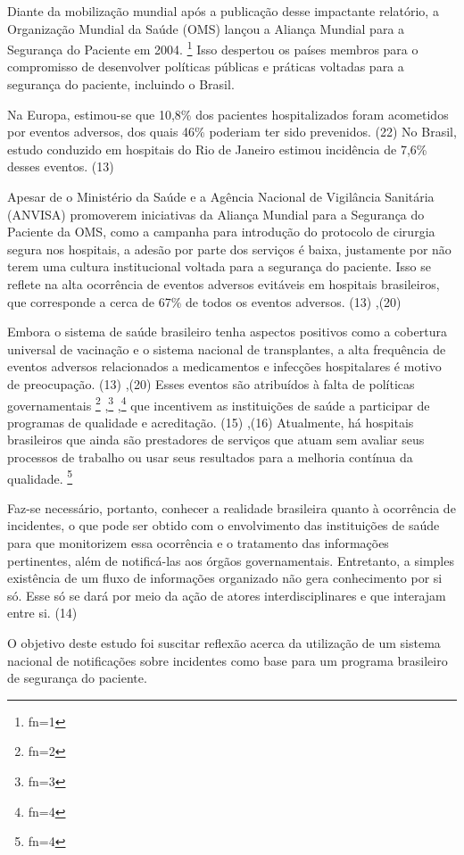 \documentclass{article}
\makeatletter
\newcommand{\fn}{\afterassignment\fn@aux\count0=}
\newcommand{\fn@aux}{\csname fn\the\count0\endcsname}
\makeatother
\begin{document}
Diante da mobilização mundial após a publicação desse impactante relatório, a
Organização
Mundial da Saúde (OMS) lançou a Aliança Mundial para a Segurança do Paciente em
2004. \footnote{\fn1}
Isso despertou os países membros para o compromisso de desenvolver políticas
públicas e práticas voltadas para a segurança do paciente, incluindo o Brasil.

Na Europa, estimou-se que 10,8\% dos pacientes hospitalizados foram acometidos
por eventos
adversos, dos quais 46\% poderiam ter sido prevenidos. (22)
No Brasil, estudo conduzido em hospitais do Rio de Janeiro estimou incidência de
7,6\% desses eventos. (13)

Apesar de o Ministério da Saúde e a Agência Nacional de Vigilância Sanitária
(ANVISA)
promoverem iniciativas da Aliança Mundial para a Segurança do Paciente da OMS,
como a
campanha para introdução do protocolo de cirurgia segura nos hospitais, a adesão
por parte
dos serviços é baixa, justamente por não terem uma cultura institucional voltada
para a
segurança do paciente. Isso se reflete na alta ocorrência de eventos adversos
evitáveis em
hospitais brasileiros, que corresponde a cerca de 67\% de todos os eventos
adversos. (13)
,(20)

Embora o sistema de saúde brasileiro tenha aspectos positivos como a cobertura
universal de
vacinação e o sistema nacional de transplantes, a alta frequência de eventos
adversos
relacionados a medicamentos e infecções hospitalares é motivo de preocupação.
(13)
,(20)
Esses eventos são atribuídos à falta de políticas governamentais \footnote{\fn2}
,\footnote{\fn3}
,\footnote{\fn4}
que incentivem as instituições de saúde a participar de programas de qualidade e
acreditação. (15)
,(16)
Atualmente, há hospitais brasileiros que ainda são prestadores de serviços que
atuam
sem avaliar seus processos de trabalho ou usar seus resultados para a melhoria
contínua da
qualidade. \footnote{\fn4}

Faz-se necessário, portanto, conhecer a realidade brasileira quanto à ocorrência
de
incidentes, o que pode ser obtido com o envolvimento das instituições de saúde
para que
monitorizem essa ocorrência e o tratamento das informações pertinentes, além de
notificá-las
aos órgãos governamentais. Entretanto, a simples existência de um fluxo de
informações
organizado não gera conhecimento por si só. Esse só se dará por meio da ação de
atores
interdisciplinares e que interajam entre si. (14)

O objetivo deste estudo foi suscitar reflexão acerca da utilização de um sistema
nacional
de notificações sobre incidentes como base para um programa brasileiro de
segurança do
paciente.
\end{document}
